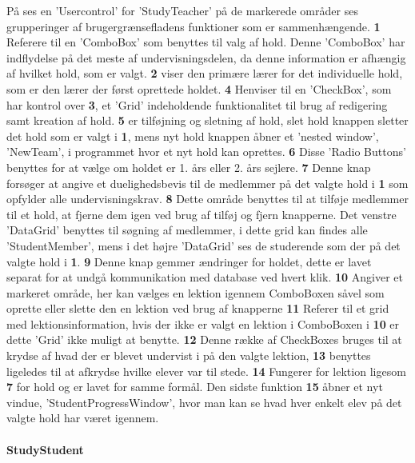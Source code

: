 På  ses en 'Usercontrol' for 'StudyTeacher' på de markerede områder ses grupperinger af brugergrænsefladens funktioner som er sammenhængende.
\textbf{1} Referere til en 'ComboBox' som benyttes til valg af hold. 
Denne 'ComboBox' har indflydelse på det meste af undervisningsdelen, da denne information er afhængig af hvilket hold, som er valgt. \textbf{2} viser den primære lærer for det individuelle hold, som er den lærer der først oprettede holdet.
\textbf{4} Henviser til en 'CheckBox', som har kontrol over \textbf{3}, et 'Grid' indeholdende funktionalitet til brug af redigering samt kreation af hold.
\textbf{5} er tilføjning og sletning af hold, slet hold knappen sletter det hold som er valgt i \textbf{1}, mens nyt hold knappen åbner et 'nested window', 'NewTeam', i programmet hvor et nyt hold kan oprettes.
\textbf{6} Disse 'Radio Buttons' benyttes for at vælge om holdet er 1. års eller 2. års sejlere.
\textbf{7} Denne knap forsøger at angive et duelighedsbevis til de medlemmer på det valgte hold i \textbf{1} som opfylder alle undervisningskrav.
\textbf{8} Dette område benyttes til at tilføje medlemmer til et hold, at fjerne dem igen ved brug af tilføj og fjern knapperne. 
Det venstre 'DataGrid' benyttes til søgning af medlemmer, i dette grid kan findes alle 'StudentMember', mens i det højre 'DataGrid' ses de studerende som der på det valgte hold i \textbf{1}.
\textbf{9} Denne knap gemmer ændringer for holdet, dette er lavet separat for at undgå kommunikation med database ved hvert klik.
\textbf{10} Angiver et markeret område, her kan vælges en lektion igennem ComboBoxen såvel som oprette eller slette den en lektion ved brug af knapperne
\textbf{11} Referer til et grid med lektionsinformation, hvis der ikke er valgt en lektion i ComboBoxen i \textbf{10} er dette 'Grid' ikke muligt at benytte.
\textbf{12} Denne række af CheckBoxes bruges til at krydse af hvad der er blevet undervist i på den valgte lektion, \textbf{13} benyttes ligeledes til at afkrydse hvilke elever var til stede.
\textbf{14} Fungerer for lektion ligesom \textbf{7} for hold og er lavet for samme formål.
Den sidste funktion \textbf{15} åbner et nyt vindue, 'StudentProgressWindow', hvor man kan se hvad hver enkelt elev på det valgte hold har været igennem.

\paragraph{StudyStudent}

